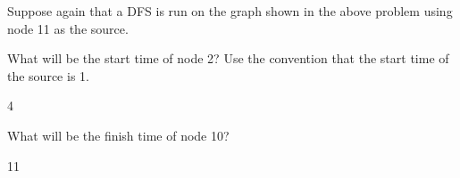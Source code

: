 \begin{prob}

    Suppose again that a DFS is run on the graph shown in the above problem using node 11
    as the source.
    
    \begin{subprobset}

        \begin{subprob}
            What will be the start time of node 2? Use the convention that the start time
            of the source is 1.

            \begin{soln}
                4
            \end{soln}

        \end{subprob}

        \begin{subprob}
            What will be the finish time of node 10?

            \begin{soln}
                11
            \end{soln}

        \end{subprob}

    \end{subprobset}

\end{prob}
